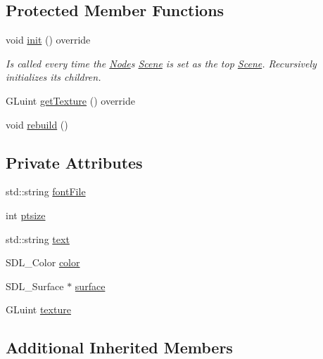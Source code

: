 \subsection*{Protected Member Functions}
\begin{DoxyCompactItemize}
\item 
void \mbox{\hyperlink{classsage_1_1TextNode_ae389b7b4afae4d068ac29686343f279e}{init}} () override
\begin{DoxyCompactList}\small\item\em Is called every time the \mbox{\hyperlink{classsage_1_1Node}{Node}}\textquotesingle{}s \mbox{\hyperlink{classsage_1_1Scene}{Scene}} is set as the top \mbox{\hyperlink{classsage_1_1Scene}{Scene}}. Recursively initializes its children. \end{DoxyCompactList}\item 
G\+Luint \mbox{\hyperlink{classsage_1_1TextNode_ae21f17c6cb993692d8da89424b2581d7}{get\+Texture}} () override
\item 
void \mbox{\hyperlink{classsage_1_1TextNode_a7984e4a663f48338da018b780704b95f}{rebuild}} ()
\end{DoxyCompactItemize}
\subsection*{Private Attributes}
\begin{DoxyCompactItemize}
\item 
std\+::string \mbox{\hyperlink{classsage_1_1TextNode_a2e09c9e2e42c0c99ea24239aa09d03c9}{font\+File}}
\item 
int \mbox{\hyperlink{classsage_1_1TextNode_a1811c136026bea8ba6f27184e2d53c0c}{ptsize}}
\item 
std\+::string \mbox{\hyperlink{classsage_1_1TextNode_a2828e281a4ea3cce151de7cc983ca2c0}{text}}
\item 
S\+D\+L\+\_\+\+Color \mbox{\hyperlink{classsage_1_1TextNode_a08cbe2019a8aef4f1bd17a3f73a04d27}{color}}
\item 
S\+D\+L\+\_\+\+Surface $\ast$ \mbox{\hyperlink{classsage_1_1TextNode_a6f15575871c6eef0b1a461aaa1b87ca2}{surface}}
\item 
G\+Luint \mbox{\hyperlink{classsage_1_1TextNode_a8ffd1a92389ec216de154ea9a5b211cc}{texture}}
\end{DoxyCompactItemize}
\subsection*{Additional Inherited Members}


